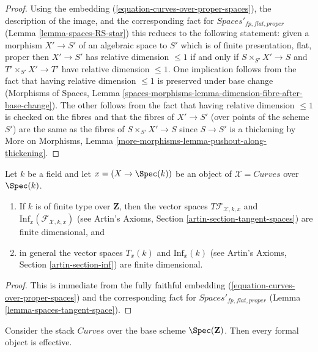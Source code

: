 \begin{proof}
Using the embedding (\ref{equation-curves-over-proper-spaces}),
the description of the image, and
the corresponding fact for $\textit{Spaces}'_{fp, flat, proper}$
(Lemma \ref{lemma-spaces-RS-star})
this reduces to the following statement:
given a morphism $X' \to S'$ of an algebraic space to $S'$
which is of finite presentation, flat, proper then
$X' \to S'$ has relative dimension $\leq 1$
if and only if $S \times_{S'} X' \to S$
and $T' \times_{S'} X' \to T'$ have relative dimension $\leq 1$.
One implication follows from the fact that
having relative dimension $\leq 1$ is preserved under base change
(Morphisms of Spaces, Lemma
\ref{spaces-morphisms-lemma-dimension-fibre-after-base-change}).
The other follows from the fact that having relative
dimension $\leq 1$ is checked on the fibres and that
the fibres of $X' \to S'$ (over points of the scheme $S'$)
are the same as the fibres of $S \times_{S'} X' \to S$
since $S \to S'$ is a thickening by
More on Morphisms, Lemma \ref{more-morphisms-lemma-pushout-along-thickening}.
\end{proof}

\begin{lemma}
\label{lemma-curves-tangent-space}
Let $k$ be a field and let $x = (X \to \Spec(k))$ be an object of
$\mathcal{X} = \textit{Curves}$ over $\Spec(k)$.
\begin{enumerate}
\item If $k$ is of finite type over $\mathbf{Z}$, then
the vector spaces $T\mathcal{F}_{\mathcal{X}, k, x}$ and
$\text{Inf}_x(\mathcal{F}_{\mathcal{X}, k, x})$
(see Artin's Axioms, Section \ref{artin-section-tangent-spaces})
are finite dimensional, and
\item in general the vector spaces $T_x(k)$ and $\text{Inf}_x(k)$
(see Artin's Axioms, Section \ref{artin-section-inf})
are finite dimensional.
\end{enumerate}
\end{lemma}

\begin{proof}
This is immediate from the fully faithful embedding
(\ref{equation-curves-over-proper-spaces}) and
the corresponding fact for $\textit{Spaces}'_{fp, flat, proper}$
(Lemma \ref{lemma-spaces-tangent-space}).
\end{proof}

\begin{lemma}
\label{lemma-curves-existence}
Consider the stack $\textit{Curves}$ over the base
scheme $\Spec(\mathbf{Z})$. Then every formal object is effective.
\end{lemma}

